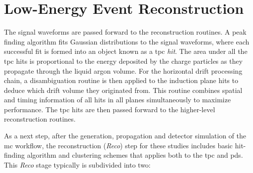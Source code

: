 \section{Low-Energy Event Reconstruction}\label{sec:RECONSTRUCTION}
The signal waveforms are passed forward to the reconstruction routines. A peak finding algorithm fits Gaussian distributions to the signal waveforms, where each successful fit is formed into an object known as a \gls{tpc} \textit{hit}. The area under all the \gls{tpc} hits is proportional to the energy deposited by the charge particles as they propagate through the liquid argon volume.  For the horizontal drift processing chain, a disambiguation routine is then applied to the induction plane hits to deduce which drift volume they originated from. This routine combines spatial and timing information of all hits in all planes simultaneously to maximize performance. The \gls{tpc} hits are then passed forward to the higher-level reconstruction routines.

As a next step, after the generation, propagation and detector simulation of the \gls{mc} workflow, the reconstruction (\emph{Reco}) step for these studies includes basic hit-finding algorithm and clustering schemes that applies both to the \gls{tpc} and \gls{pds}. This \emph{Reco} stage typically is subdivided into two:

